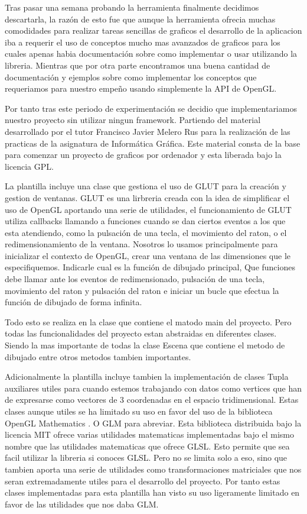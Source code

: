 Tras pasar una semana probando la herramienta finalmente decidimos descartarla, la razón de esto fue que aunque la herramienta ofrecia muchas comodidades para realizar tareas sencillas de graficos
el desarrollo de la aplicacion iba a requerir el uso de conceptos mucho mas avanzados de graficos para los cuales apenas habia documentación sobre como implementar o usar utilizando la libreria. Mientras que por otra parte encontramos una buena cantidad de documentación y ejemplos sobre como implementar los conceptos que requeriamos para nuestro empeño usando simplemente la API de OpenGL.

Por tanto tras este periodo de experimentación se decidio que 
implementariamos nuestro proyecto sin utilizar ningun framework. Partiendo del material desarrollado por el tutor Francisco Javier Melero Rus para la realización de las practicas de la asignatura de Informática Gráfica. Este material consta de la base para comenzar un proyecto de graficos por ordenador y esta liberada bajo la licencia GPL\cite{gplv3}.

La plantilla incluye una clase que gestiona el uso de GLUT para la creación y gestion de ventanas. GLUT es una lirbreria creada con la idea de simplificar el uso de OpenGL aportando una serie de utilidades, el funcionamiento de GLUT utiliza callbacks llamando a funciones cuando se dan ciertos eventos a los que esta atendiendo, como la pulsación de una tecla, el movimiento del raton, o el redimensionamiento de la ventana. Nosotros lo usamos principalmente para inicializar el contexto de OpenGL, crear una ventana de las dimensiones que le especifiquemos. Indicarle cual es la función de dibujado principal, Que funciones debe llamar ante los eventos de redimensionado, pulsación de una tecla, movimiento del raton y pulsación del raton e iniciar un bucle que efectua la función de dibujado de forma infinita.

Todo esto se realiza en la clase que contiene el matodo main del proyecto. Pero todas las funcionalidades del proyecto estan abstraidas en diferentes clases. Siendo la mas importante de todas la clase Escena que contiene el metodo de dibujado entre otros metodos tambien importantes.

Adicionalmente la plantilla incluye tambien la implementación de clases Tupla auxiliares utiles para cuando estemos trabajando con datos como vertices que han de expresarse como vectores de 3 coordenadas en el espacio tridimensional. Estas clases aunque utiles se ha limitado su uso en favor del uso de la biblioteca OpenGL Mathematics \cite{gtrucOpenGLMathematics}. O GLM para abreviar. Esta biblioteca distribuida bajo la licencia MIT \cite{GLMLICENSE} ofrece varias utilidades matematicas implementadas bajo el mismo nombre que las utilidades matematicas que ofrece GLSL. Esto permite que sea facil utilizar la libreria si conoces GLSL. Pero no se limita solo a eso, sino que tambien aporta una serie de utilidades como transformaciones matriciales que nos seran extremadamente utiles para el desarrollo del proyecto. Por tanto estas clases implementadas para esta plantilla han visto su uso ligeramente limitado en favor de las utilidades que nos daba GLM.


